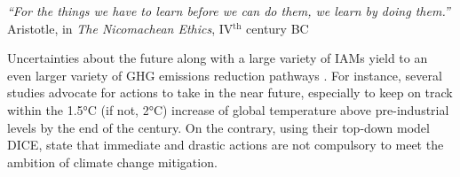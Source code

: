 \vspace{-0.2cm}
\begin{flushright}
\emph{``For the things we have to learn before we can do them, we learn by doing them.''}\\
Aristotle, in \textit{The Nicomachean Ethics}, IV$^\text{th}$ century BC
\end{flushright}
\vspace{0.4cm}

Uncertainties about the future along with a large variety of \gls{IAMs} yield to an even larger variety of \gls{GHG} emissions reduction pathways \cite{nicolas2021robust}. For instance, several studies \cite{IPCC_CO2_budget,steffen2018trajectories} advocate for actions to take in the near future, especially to keep on track within the 1.5°C (if not, 2°C) increase of global temperature above pre-industrial levels by the end of the century. On the contrary, using their top-down model DICE, \citet{nordhaus2014question} state that immediate and drastic actions are not compulsory to meet the ambition of climate change mitigation. 

